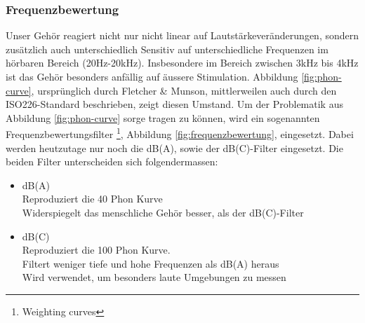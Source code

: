 \documentclass[12pt]{article}
\begin{document}
	\subsubsection*{Frequenzbewertung} \label{Frequenzbewertung}
	Unser Gehör reagiert nicht nur nicht linear auf Lautstärkeveränderungen, sondern zusätzlich auch unterschiedlich Sensitiv auf unterschiedliche Frequenzen im hörbaren Bereich (20Hz-20kHz). Insbesondere im Bereich zwischen 3kHz bis 4kHz \cite{impairments_basics_2004} ist das Gehör besonders anfällig auf äussere Stimulation. Abbildung \ref{fig:phon-curve}, ursprünglich durch Fletcher \& Munson, mittlerweilen auch durch den ISO226-Standard beschrieben, zeigt diesen Umstand. Um der Problematik aus Abbildung \ref{fig:phon-curve} sorge tragen zu können, wird ein sogenannten Frequenzbewertungsfilter \footnote{ Weighting curves}, Abbildung \ref{fig:frequenzbewertung}, eingesetzt. Dabei werden heutzutage nur noch die dB(A), sowie der dB(C)-Filter eingesetzt. Die beiden Filter unterscheiden sich folgendermassen:
	\begin{itemize}
		\item dB(A) \\
		Reproduziert die 40 Phon Kurve \\
		Widerspiegelt das menschliche Gehör besser, als der dB(C)-Filter
		\item dB(C) \\
		Reproduziert die 100 Phon Kurve.\\
		Filtert weniger tiefe und hohe Frequenzen als dB(A) heraus\\
		Wird verwendet, um besonders laute Umgebungen zu messen
	\end{itemize}
\end{document}
